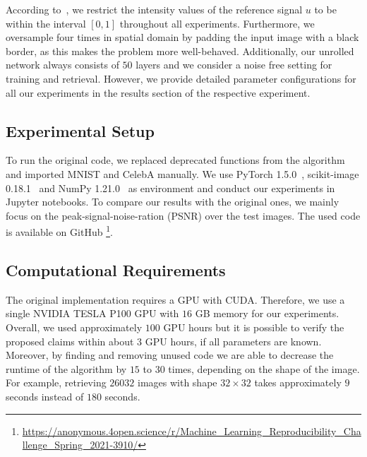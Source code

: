 According to~\cite{hyder2020solving}, we restrict the intensity values of the reference signal $u$ to be within the interval $[0,1]$ throughout all experiments. Furthermore, we oversample four times in spatial domain by padding the input image with a black border, as this makes the problem more well-behaved. Additionally, our unrolled network always consists of $50$ layers and we consider a noise free setting for training and retrieval. However, we provide detailed parameter configurations for all our experiments in the results section of the respective experiment.

\subsection{Experimental Setup}

To run the original code, we replaced deprecated functions from the
algorithm and imported MNIST and CelebA manually. We use PyTorch
1.5.0~\cite{pytorch}, scikit-image 0.18.1~\cite{scikit} and NumPy
1.21.0~\cite{numpy} as environment and conduct our experiments in
Jupyter notebooks. To compare our results with the original ones, we
mainly focus on the peak-signal-noise-ration (PSNR) over the test
images. The used code is available on GitHub \footnote{\url{https://anonymous.4open.science/r/Machine_Learning_Reproducibility_Challenge_Spring_2021-3910/}}.




\subsection{Computational Requirements}

The original implementation requires a GPU with CUDA. Therefore, we
use a single NVIDIA TESLA P100 GPU with $16$ GB memory for our
experiments. Overall, we used approximately $100$ GPU hours but it is possible to verify the proposed claims within about $3$ GPU hours, if all parameters are known. Moreover, by finding and
removing unused code we are able to decrease the runtime of the
algorithm by $15$ to $30$ times, depending on the shape of the
image. For example, retrieving $26032$ images with shape $32\times32$
takes approximately $9$ seconds instead of $180$ seconds.


